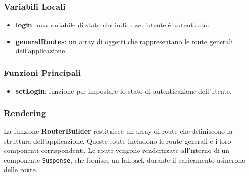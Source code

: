 \documentclass{article}
\begin{document}
\subsubsection*{Variabili Locali}
\begin{itemize}
    \item \textbf{login}: una variabile di stato che indica se l'utente è autenticato.
    \item \textbf{generalRoutes}: un array di oggetti che rappresentano le route generali dell'applicazione.
\end{itemize}

\subsubsection*{Funzioni Principali}
\begin{itemize}
    \item \textbf{setLogin}: funzione per impostare lo stato di autenticazione dell'utente.
\end{itemize}

\subsubsection*{Rendering}
La funzione \textbf{RouterBuilder} restituisce un array di route che definiscono la struttura dell'applicazione. Queste route includono le route generali e i loro componenti corrispondenti. Le route vengono renderizzate all'interno di un componente \texttt{Suspense}, che fornisce un fallback durante il caricamento asincrono delle route.
\end{document}
